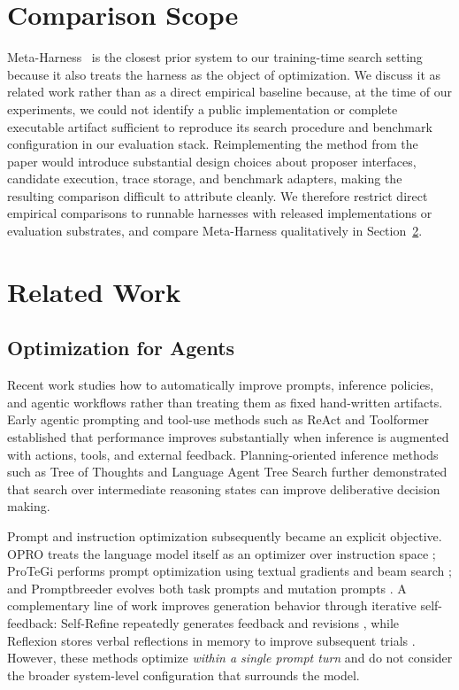\documentclass{article}
\begin{document}
\section{Comparison Scope}
\label{app:comparison_scope}

Meta-Harness~\citep{lee2026metaharness} is the closest prior system to
our training-time search setting because it also treats the harness as
the object of optimization. We discuss it as related work rather than as
a direct empirical baseline because, at the time of our experiments, we
could not identify a public implementation or complete executable
artifact sufficient to reproduce its search procedure and benchmark
configuration in our evaluation stack. Reimplementing the method from
the paper would introduce substantial design choices about proposer
interfaces, candidate execution, trace storage, and benchmark adapters,
making the resulting comparison difficult to attribute cleanly. We
therefore restrict direct empirical comparisons to runnable harnesses
with released implementations or evaluation substrates, and compare
Meta-Harness qualitatively in Section~\ref{sec:related}.

\section{Related Work}
\label{sec:related}

\subsection{Optimization for Agents}
\label{sec:related_opt}

Recent work studies how to automatically improve prompts, inference policies, and
agentic workflows rather than treating them as fixed hand-written artifacts.
Early agentic prompting and tool-use methods such as ReAct
\citep{yao2023react} and Toolformer \citep{schick2023toolformer} established
that performance improves substantially when inference is augmented with
actions, tools, and external feedback. Planning-oriented inference methods such
as Tree of Thoughts \citep{yao2023treeofthoughts} and Language Agent Tree Search
\citep{zhou2023lats} further demonstrated that search over intermediate reasoning
states can improve deliberative decision making.

Prompt and instruction optimization subsequently became an explicit objective.
OPRO treats the language model itself as an optimizer over instruction space
\citep{yang2023opro}; ProTeGi performs prompt optimization using textual
gradients and beam search \citep{pryzant2023automatic}; and Promptbreeder
evolves both task prompts and mutation prompts \citep{fernando2023promptbreeder}.
A complementary line of work improves generation behavior through iterative
self-feedback: Self-Refine repeatedly generates feedback and revisions
\citep{madaan2023selfrefine}, while Reflexion stores verbal reflections in
memory to improve subsequent trials \citep{shinn2023reflexion}.
However, these methods optimize \emph{within a single prompt turn} and do not
consider the broader system-level configuration that surrounds the model.
\end{document}

